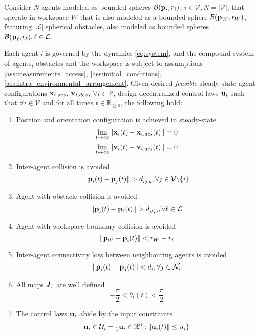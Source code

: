 \begin{bg_box}
\begin{problem}
  Consider $N$ agents modeled as bounded spheres $\mathcal{B}(\bm{\mathbf{p}}_i, r_i)$,
  $i \in \mathcal{V}, N = |\mathcal{V}|$, that operate in workspace $W$ that is
  also modeled as a bounded sphere $\mathcal{B}(\bm{\mathbf{p}}_W,r_W)$,
  featuring $|\mathcal{L}|$ spherical obstacles, also modeled as bounded
  spheres $\mathcal{B}(\bm{\mathbf{p}}_{\ell}, r_{\ell}), \ell \in \mathcal{L}$.

  Each agent $i$ is governed by the dynamics \eqref{eq:system}, and the compound
  system of agents, obstacles and the workspace is subject to assumptions
  \eqref{ass:measurements_access}, \eqref{ass:initial_conditions},
  \eqref{ass:intra_environmental_arrangement}. Given desired \textit{feasible}
  steady-state agent configurations $\bm{\mathbf{x}}_{i,des}$, $\bm{\mathbf{v}}_{i,des}$,
  $\forall i \in \mathcal{V}$, design decentralized control laws
  $\bm{\mathbf{u}}_i$ such that $\forall i \in \mathcal{V}$ and for all times $t \in \mathbb{R}_{\geq 0}$,
  the following hold:

  \begin{enumerate}

    \item Position and orientation configuration is achieved in steady-state
      $$\lim_{t \to \infty} \|\bm{\mathbf{x}}_i(t) - \bm{\mathbf{x}}_{i,des}(t)\| = 0$$
      $$\lim_{t \to \infty} \|\bm{\mathbf{v}}_i(t) - \bm{\mathbf{v}}_{i,des}(t)\| = 0$$

    \item Inter-agent collision is avoided
      $$\|\bm{\mathbf{p}}_i(t) - \bm{\mathbf{p}}_j(t)\| > \underline{d}_{ij,a},
      \forall j \in \mathcal{V} \backslash \{i\}$$

    \item Agent-with-obstacle collision is avoided
      $$\|\bm{\mathbf{p}}_i(t) - \bm{\mathbf{p}}_{\ell}(t)\| > \underline{d}_{i\ell,o},
      \forall \ell \in \mathcal{L}$$

    \item Agent-with-workspace-boundary collision is avoided
      $$\|\bm{\mathbf{p}}_W - \bm{\mathbf{p}}_i(t)\| < r_W - r_i$$

    \item Inter-agent connectivity loss between neighbouring agents is avoided
      $$\|\bm{\mathbf{p}}_i(t) - \bm{\mathbf{p}}_j(t)\| < d_i,
      \forall j \in \mathcal{N}_i$$

    \item All maps $\bm{\mathit{J}}_i$ are well defined
      $$- \frac{\pi}{2} < \theta_i(t) < \frac{\pi}{2}$$

    \item The control laws $\bm{\mathbf{u}}_i$ abide by the input constraints
      $$\bm{\mathbf{u}}_i \in \mathcal{U}_i = \{ \bm{\mathbf{u}}_i \in \mathbb{R}^6 :
        \|\bm{\mathbf{u}}_i (t)\| \leq \overline{u}_i\} $$

  \end{enumerate}
\label{problem}
\end{problem}
\end{bg_box}
